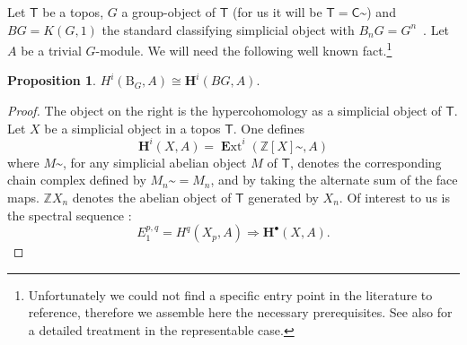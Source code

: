 \documentclass{amsart}
\numberwithin{equation}{subsection}
\newtheorem{proposition}[theorem]{Proposition}
\theoremstyle{remark}
\theoremstyle{remark}
\newcommand{\bbZ}{\mathbb{Z}}
\newcommand{\B}{\mathrm{B}} %
\newcommand{\C}{\mathsf{C}} %
\DeclareMathOperator{\EExt}{\textbf{E}xt}
\newcommand{\HH}{\mathbf{H}} %
\newcommand{\iso}{\cong}
\newcommand{\shC}{\C\sptilde} %
\newcommand{\T}{\mathsf{T}} %
\begin{document}
Let $\T$ be a topos, $G$ a group-object of $\T$ (for us it will be $\T=\shC$) and $BG=K(G,1)$ the standard classifying simplicial object with $B_nG=G^n$~\cite{DeligneH3}. Let $A$ be a trivial $G$-module. We will need the following well known fact.\footnote{Unfortunately we could not find a specific entry point in the literature to reference, therefore we assemble here the necessary prerequisites. See also \cite[\S\S 2,3]{chinburg} for a detailed treatment in the representable case.}
\begin{proposition}
  \label{simpltop}
  \begin{math}H^i(\B_G,A) \iso \HH^i(BG,A).
  \end{math}
\end{proposition}
\begin{proof}
The object on the right is the hypercohomology as a simplicial object of $\T$. Let $X$ be a simplicial object in a topos $\T$. One defines
\begin{equation*}
  \HH^i(X,A) = \EExt^i(\bbZ[X]\sptilde, A)
\end{equation*}
where $M\sptilde$, for any simplicial abelian object $M$ of $\T$, denotes the corresponding chain complex defined by $M_n\sptilde=M_n$, and by taking the alternate sum of the face maps. $\bbZ X_n$ denotes the abelian object of $\T$ generated by $X_n$. Of interest to us is the spectral sequence \cite[Example (2.10) and below]{Breen}:
\begin{equation*}
  E_1^{p,q} = H^q(X_p,A) \Longrightarrow \HH^\bullet(X, A).
\end{equation*}


\end{proof}
\end{document}

